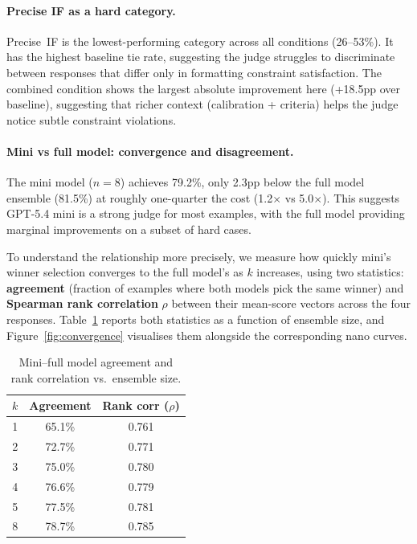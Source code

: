 \documentclass{article}
\begin{document}
\paragraph{Precise IF as a hard category.}
\label{sec:precise-if}
Precise~IF is the lowest-performing category across all conditions (26--53\%). It has the highest baseline tie rate, suggesting the judge struggles to discriminate between responses that differ only in formatting constraint satisfaction. The combined condition shows the largest absolute improvement here (+18.5pp over baseline), suggesting that richer context (calibration + criteria) helps the judge notice subtle constraint violations.

\paragraph{Mini vs full model: convergence and disagreement.}
\label{sec:convergence}
The mini model ($n{=}8$) achieves 79.2\%, only 2.3pp below the full model ensemble (81.5\%) at roughly one-quarter the cost (1.2$\times$ vs 5.0$\times$). This suggests GPT-5.4 mini is a strong judge for most examples, with the full model providing marginal improvements on a subset of hard cases.

To understand the relationship more precisely, we measure how quickly mini's winner selection converges to the full model's as $k$ increases, using two statistics: \textbf{agreement} (fraction of examples where both models pick the same winner) and \textbf{Spearman rank correlation} $\rho$ between their mean-score vectors across the four responses. Table~\ref{tab:convergence} reports both statistics as a function of ensemble size, and Figure~\ref{fig:convergence} visualises them alongside the corresponding nano curves.

\begin{table}[ht]
\centering
\caption{Mini--full model agreement and rank correlation vs.\ ensemble size.}
\label{tab:convergence}
\begin{tabular}{ccc}
\toprule
$k$ & Agreement & Rank corr ($\rho$) \\
\midrule
1 & 65.1\% & 0.761 \\
2 & 72.7\% & 0.771 \\
3 & 75.0\% & 0.780 \\
4 & 76.6\% & 0.779 \\
5 & 77.5\% & 0.781 \\
8 & 78.7\% & 0.785 \\
\bottomrule
\end{tabular}
\end{table}
\end{document}
